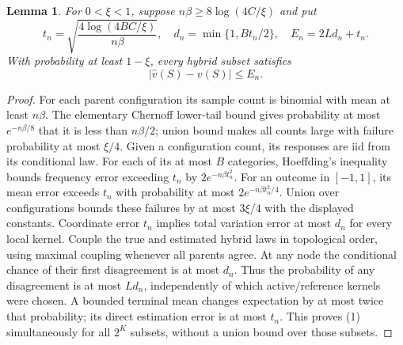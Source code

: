 \documentclass[11pt]{article}
\newtheorem{lemma}[theorem]{Lemma}
\theoremstyle{definition}
\begin{document}
\begin{lemma}
For $0<\xi<1$, suppose $n\beta\ge8\log(4C/\xi)$ and put
\[
 t_n=\sqrt{\frac{4\log(4BC/\xi)}{n\beta}},\quad
 d_n=\min\{1,Bt_n/2\},\quad E_n=2Ld_n+t_n.
\]
With probability at least $1-\xi$, every hybrid subset satisfies
\[
 |\widehat v(S)-v(S)|\le E_n.                           \tag{1}
\]
\end{lemma}
\begin{proof}
For each parent configuration its sample count is binomial with mean at
least $n\beta$. The elementary Chernoff lower-tail bound gives probability
at most $e^{-n\beta/8}$ that it is less than $n\beta/2$; union bound
makes all counts large with failure probability at most $\xi/4$.
Given a configuration count, its responses are iid from its conditional
law. For each of its at most $B$ categories, Hoeffding's inequality bounds
frequency error exceeding $t_n$ by $2e^{-n\beta t_n^2}$.
For an outcome in $[-1,1]$, its mean error exceeds $t_n$ with probability
at most $2e^{-n\beta t_n^2/4}$. Union over configurations bounds these
failures by at most $3\xi/4$ with the displayed constants.
Coordinate error $t_n$ implies total variation error at most $d_n$ for
every local kernel. Couple the true and estimated hybrid laws in topological
order, using maximal coupling whenever all parents agree. At any node the
conditional chance of their first disagreement is at most $d_n$.
Thus the probability of any disagreement is at most $Ld_n$, independently
of which active/reference kernels were chosen. A bounded terminal mean
changes expectation by at most twice that probability; its direct estimation
error is at most $t_n$. This proves (1) simultaneously for all $2^K$ subsets,
without a union bound over those subsets.
\end{proof}
\end{document}
